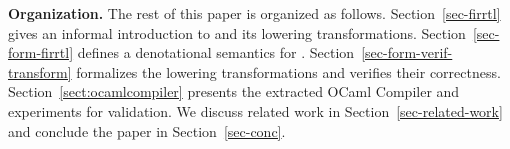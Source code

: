 


\smallskip
\noindent
{\bf Organization.}
The rest of this paper is organized as follows. Section~\ref{sec-firrtl} gives an informal introduction to {\firrtl} and its lowering transformations. Section~\ref{sec-form-firrtl} defines a denotational semantics for \hifirrtl. Section~\ref{sec-form-verif-transform} formalizes the lowering transformations and verifies their correctness. %
Section~\ref{sect:ocamlcompiler} presents the extracted OCaml Compiler and experiments for validation.
We discuss related work in Section~\ref{sec-related-work} and conclude the paper in Section~\ref{sec-conc}.


